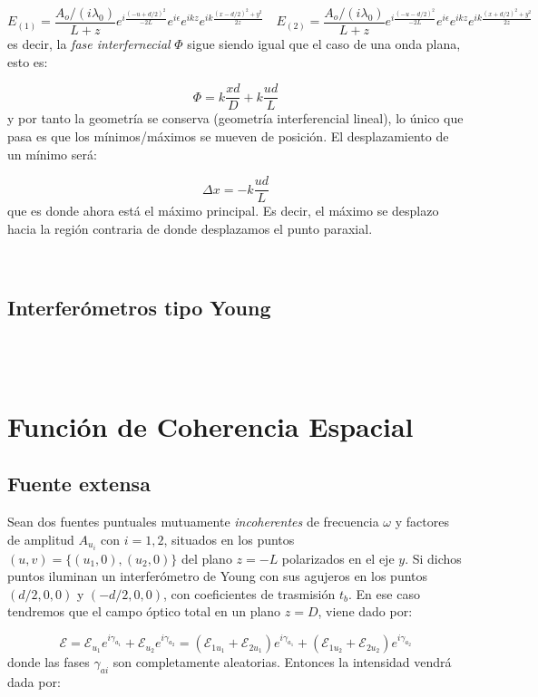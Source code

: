 \documentclass[12pt,a4paper]{book}
\numberwithin{equation}{section}
\numberwithin{figure}{section}
\newcommand{\1}{_{(1)}}
\newcommand{\2}{_{(2)}}
\newcommand{\Encal}{\boldsymbol{\mathcal{E}}}
\theoremstyle{definition}
\begin{document}
$$  E\1 = \frac{A_{o} / (i \lambda_0)}{L+z} e^{i\frac{(-u+d/2)^2}{-2L}} e^{i \epsilon} e^{ikz} e^{ik\frac{(x - d/2)^2+y^2}{2z}}  \quad
E\2 = \frac{A_{o} / (i \lambda_0)}{L+z} e^{i\frac{(-u-d/2)^2}{-2L}} e^{i \epsilon} e^{ikz} e^{ik\frac{(x + d/2)^2+y^2}{2z}} $$
es decir, la \textit{fase interfernecial} $\Phi$ sigue siendo igual que el caso de una onda plana, esto es:

$$ \Phi = k \frac{xd}{D} + k \frac{ud}{L} $$
y por tanto la geometría se conserva (geometría interferencial lineal), lo único que pasa es que los mínimos/máximos se mueven de posición. El desplazamiento de un mínimo será:

$$ \Delta x = - k \frac{ud}{L} $$
que es donde ahora está el máximo principal. Es decir, el máximo se desplazo hacia la región contraria de donde desplazamos el punto paraxial. 

\hrulefill \\


\subsection{Interferómetros tipo Young}

 \\

 \\


\section{Función de Coherencia Espacial}

\subsection{Fuente extensa}

Sean dos fuentes puntuales mutuamente \textit{incoherentes} de frecuencia $\omega$ y factores de amplitud $A_{u_i}$ con $i=1,2$, situados en los puntos $(u,v) = \lbrace (u_1,0),(u_2,0) \rbrace$ del plano $z=-L$ polarizados en el eje $y$. Si dichos puntos iluminan un interferómetro de Young con sus agujeros en los puntos $(d/2,0,0)$ y $(-d/2,0,0)$, con coeficientes de trasmisión $t_b$. En ese caso tendremos que el campo óptico total en un plano $z=D$, viene dado por:

\begin{equation}
\Encal = \Encal_{u_1} e^{i \gamma_{a_1}} + \Encal_{u_2} e^{i \gamma_{a_2}} = (\Encal_{1u_1} + \Encal_{2u_1} )e^{i \gamma_{a_1}} + ( \Encal_{1u_2} +\Encal_{2u_2} ) e^{i \gamma_{a_2}}
\end{equation}
donde las fases $\gamma_{ai}$ son completamente aleatorias. Entonces la intensidad vendrá dada por:
\end{document}
